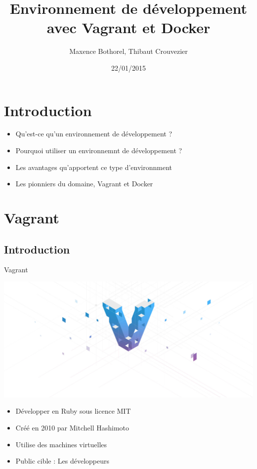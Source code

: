 \documentclass{beamer}
\title{Environnement de développement avec Vagrant et Docker}
\author{Maxence Bothorel, Thibaut Crouvezier}
\institute{Licence professionnelle ASRALL,\\
    IUT Nancy Charlemagne,\\
    Nancy}
\date{22/01/2015}
\begin{document}
    \begin{frame}
        \maketitle{}
    \end{frame}
    	
    \section{Introduction}
    	
    \begin{frame}
        \begin{itemize}
           \item{Qu'est-ce qu'un environnement de développement ?}
           \item{Pourquoi utiliser un environnemnt de développement ?}
           \item{Les avantages qu'apportent ce type d'environnment}
           \item{Les pionniers du domaine, Vagrant et Docker}
        \end{itemize}
    \end{frame}
    
    \section{Vagrant}
    \subsection{Introduction}
    
    \begin{frame}{Vagrant}
        \begin{center}
            \includegraphics[scale=0.1]{images_rapport/vagrant_logo.jpg}
        \end{center}
        \begin{itemize}
            \item{Développer en Ruby sous licence MIT}
            \item{Créé en 2010 par Mitchell Hashimoto}
            \pause{}
            \item{Utilise des machines virtuelles}
            \item{Public cible : Les développeurs}
        \end{itemize}
    \end{frame}
\end{document}
